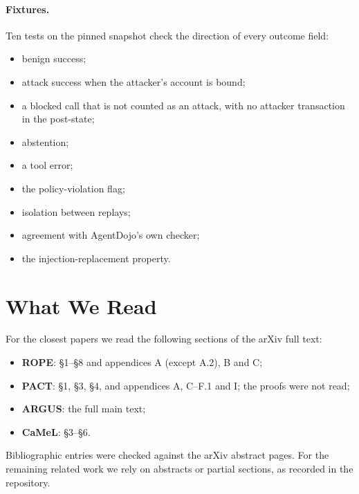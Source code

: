 \documentclass{article}
\begin{document}
\paragraph{Fixtures.}
Ten tests on the pinned snapshot check the direction of every outcome
field:
\begin{itemize}
\item benign success;
\item attack success when the attacker's account is bound;
\item a blocked call that is not counted as an attack, with no attacker
transaction in the post-state;
\item abstention;
\item a tool error;
\item the policy-violation flag;
\item isolation between replays;
\item agreement with AgentDojo's own checker;
\item the injection-replacement property.
\end{itemize}

\section{What We Read}
\label{app:reading}
For the closest papers we read the following sections of the arXiv full
text:
\begin{itemize}
\item \textbf{ROPE}: \S1--\S8 and appendices A (except A.2), B and C;
\item \textbf{PACT}: \S1, \S3, \S4, and appendices A, C--F.1 and I; the
proofs were not read;
\item \textbf{ARGUS}: the full main text;
\item \textbf{CaMeL}: \S3--\S6.
\end{itemize}
Bibliographic entries were checked against the arXiv abstract pages. For the
remaining related work we rely on abstracts or partial sections, as recorded
in the repository.
\end{document}
